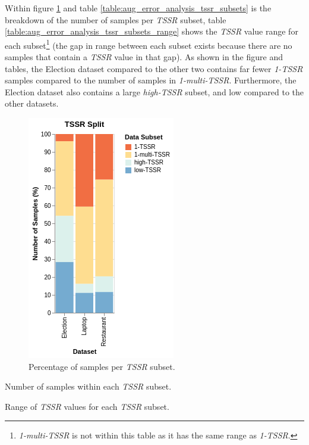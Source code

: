 Within figure \ref{fig:aug_error_analysis_tssr_subsets} and table \ref{table:aug_error_analysis_tssr_subsets} is the breakdown of the number of samples per \textit{TSSR} subset, table \ref{table:aug_error_analysis_tssr_subsets_range} shows the \textit{TSSR} value range for each subset\footnote{\textit{1-multi-TSSR} is not within this table as it has the same range as \textit{1-TSSR}.} (the gap in range between each subset exists because there are no samples that contain a \textit{TSSR} value in that gap). As shown in the figure and tables, the Election dataset compared to the other two contains far fewer \textit{1-TSSR} samples compared to the number of samples in \textit{1-multi-TSSR}. Furthermore, the Election dataset also contains a large \textit{high-TSSR} subset, and low compared to the other datasets. 

\begin{figure}[!ht]
    \centering
    \includegraphics[scale=0.6]{images/augmentation/error_analysis/tssr_subsets.png}
    \caption{Percentage of samples per \textit{TSSR} subset.}
    \label{fig:aug_error_analysis_tssr_subsets}
\end{figure}

\begin{table}[!ht]
    \centering
    
    \caption{Number of samples within each \textit{TSSR} subset.}
    \label{table:aug_error_analysis_tssr_subsets}
\end{table}

\begin{table}[!ht]
    \centering
    
    \caption{Range of \textit{TSSR} values for each \textit{TSSR} subset.}
    \label{table:aug_error_analysis_tssr_subsets_range}
\end{table}

